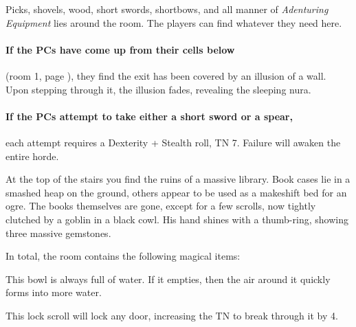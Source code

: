 \begin{multicols}{2}
\begin{exampletext}
\end{exampletext}

Picks, shovels, wood, short swords, shortbows, and all manner of \textit{Adenturing Equipment} lies around the room.
The players can find whatever they need here.

\paragraph{If the PCs have come up from their cells below}
(room 1, page \pageref{entrycell}), they find the exit has been covered by an illusion of a wall.
Upon stepping through it, the illusion fades, revealing the sleeping nura.

\paragraph{If the PCs attempt to take either a short sword or a spear,}
each attempt requires a Dexterity + Stealth roll, TN 7.
Failure will awaken the entire horde.


\addtocounter{enemyNo}{-2}



\begin{boxtext}

	At the top of the stairs you find the ruins of a massive library.
	Book cases lie in a smashed heap on the ground, others appear to be used as a makeshift bed for an ogre.
	The books themselves are gone, except for a few scrolls, now tightly clutched by a goblin in a black cowl.
	His hand shines with a thumb-ring, showing three massive gemstones.

\end{boxtext}

In total, the room contains the following magical items:


This bowl is always full of water.
If it empties, then the air around it quickly forms into more water.


This lock scroll will lock any door, increasing the TN to break through it by 4.



\end{multicols}
